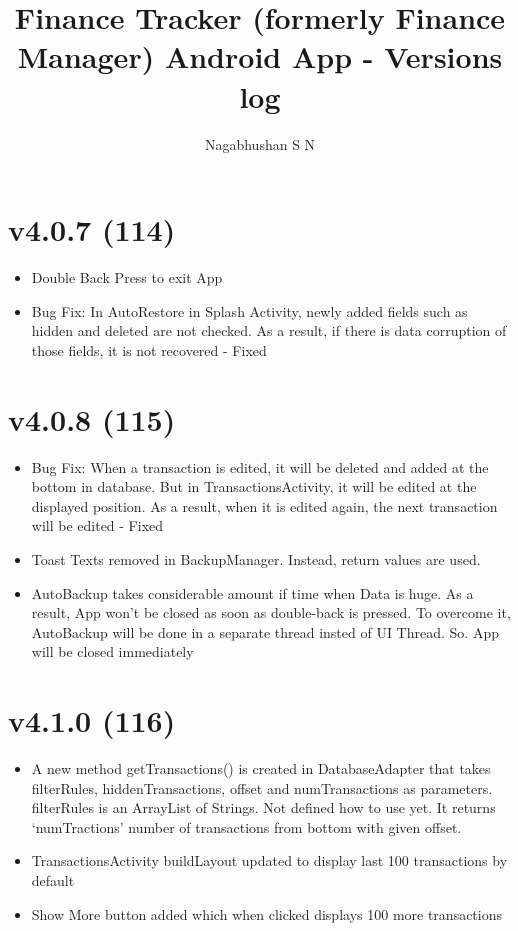 \documentclass{article}
\title{Finance Tracker (formerly Finance Manager) Android App - Versions log}
\author{Nagabhushan S N}
\begin{document}
    \maketitle
    \tableofcontents
    \newpage

    \section{v4.0.7 (114)}\label{sec:114}
    \begin{itemize}
        \item Double Back Press to exit App
        \item Bug Fix: In AutoRestore in Splash Activity, newly added fields such as hidden and deleted are not checked.
        As a result, if there is data corruption of those fields, it is not recovered - Fixed
    \end{itemize}

    \section{v4.0.8 (115)}\label{sec:115}
    \begin{itemize}
        \item Bug Fix: When a transaction is edited, it will be deleted and added at the bottom in database.
        But in TransactionsActivity, it will be edited at the displayed position.
        As a result, when it is edited again, the next transaction will be edited - Fixed
        \item Toast Texts removed in BackupManager.
        Instead, return values are used.
        \item AutoBackup takes considerable amount if time when Data is huge.
        As a result, App won't be closed as soon as double-back is pressed.
        To overcome it, AutoBackup will be done in a separate thread insted of UI Thread.
        So. App will be closed immediately
    \end{itemize}

    \section{v4.1.0 (116)}\label{sec:116}
    \begin{itemize}
        \item A new method getTransactions() is created in DatabaseAdapter that takes filterRules, hiddenTransactions, offset and numTransactions as parameters.
        filterRules is an ArrayList of Strings.
        Not defined how to use yet.
        It returns `numTractions' number of transactions from bottom with given offset.
        \item TransactionsActivity buildLayout updated to display last 100 transactions by default
        \item Show More button added which when clicked displays 100 more transactions
    \end{itemize}
\end{document}
